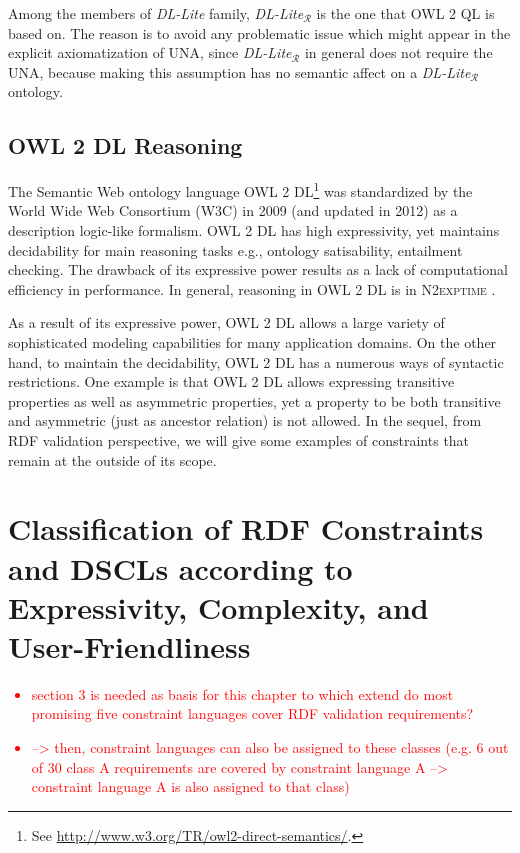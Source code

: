 \documentclass{llncs}
\newcommand{\tb}[1]{\todo[size=\small, color=green!40]{\textbf{Thomas:} #1}}
\begin{document}
Among the members of \textit{DL-Lite} family, \textit{DL-Lite}$_\mathcal{R}$ is the one that OWL 2 QL is based on. The reason is to avoid any problematic issue which might appear in the explicit axiomatization of UNA, since  \textit{DL-Lite}$_\mathcal{R}$ in general does not require the UNA, because making this assumption has no semantic affect on a \textit{DL-Lite}$_\mathcal{R}$ ontology.

\subsection{OWL 2 DL Reasoning}


The Semantic Web ontology language OWL 2 DL\footnote{See \url{http://www.w3.org/TR/owl2-direct-semantics/}.} was standardized by
the World Wide Web Consortium (W3C) in 2009 (and updated in 2012) as a
description logic-like formalism.  OWL 2 DL has high expressivity, yet maintains  decidability for main reasoning tasks e.g., ontology satisability, 
entailment checking. The drawback of its expressive power results as a lack of computational efficiency in performance. In general, reasoning in OWL 2 DL is in \textsc{N2exptime} \cite{owl2profiles2008}. 

As a result of its expressive power, OWL 2 DL allows a large variety of sophisticated modeling capabilities for many application domains.  On the other hand, to maintain the decidability, OWL 2 DL has a numerous ways of syntactic restrictions. One example is that OWL 2 DL allows  expressing transitive properties as well as asymmetric properties, yet a property to be both transitive and asymmetric (just as ancestor relation) is not allowed. In the sequel, from RDF validation perspective, we will give some examples of constraints that remain at the outside of its scope. 

\section{Classification of RDF Constraints and DSCLs according to Expressivity, Complexity, and User-Friendliness}

\textcolor{red}{
\begin{itemize}
	\item section 3 is needed as basis for this chapter to which extend do most promising five constraint languages cover RDF validation requirements?
	\item --> then, constraint languages can also be assigned to these classes (e.g. 6 out of 30 class A requirements are covered by constraint language A --> constraint language A is also assigned to that class)
\end{itemize}
}
\end{document}
